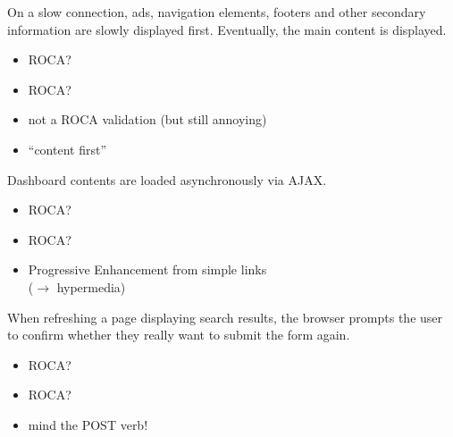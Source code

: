 \documentclass{beamer}
\newcommand{\rocaok}{\ding{51}}
\newcommand{\rocafail}{\ding{55}}
\begin{document}
\begin{frame}
  On a slow connection, ads, navigation elements, footers and other secondary
  information are slowly displayed first. Eventually, the main content is displayed.

  \vspace{0.3cm}
  \begin{itemize}
    \item<1|only@1>[\Large $\square$] \Large ROCA?
    \item<2|only@2>[\Large ?] \Large ROCA?
    \item<2> not a ROCA validation (but still annoying)
    \item<2> ``content first''
  \end{itemize}

\end{frame}

\begin{frame}
  Dashboard contents are loaded asynchronously via AJAX.

  \vspace{0.3cm}
  \begin{itemize}
    \item<1|only@1>[\Large $\square$] \Large ROCA?
    \item<2|only@2>[\Large \rocaok] \Large ROCA?
    \item<2> Progressive Enhancement from simple links \\ (\ensuremath{\rightarrow} hypermedia)
  \end{itemize}

\end{frame}

\begin{frame}
  When refreshing a page displaying search results, the browser prompts the
  user to confirm whether they really want to submit the form again.

  \vspace{0.3cm}
  \begin{itemize}
    \item<1|only@1>[\Large $\square$] \Large ROCA?
    \item<2|only@2>[\Large \rocafail] \Large ROCA?
    \item<2> mind the POST verb!
  \end{itemize}

\end{frame}
\end{document}
